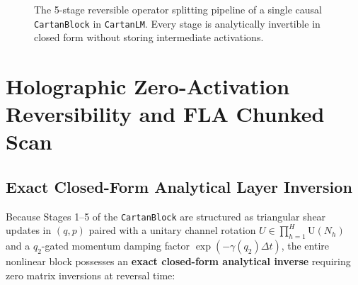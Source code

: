 \documentclass[11pt,a4paper]{article}
\begin{document}
\begin{figure}[!t]
\caption{The 5-stage reversible operator splitting pipeline of a single causal \texttt{CartanBlock} in \texttt{CartanLM}. Every stage is analytically invertible in closed form without storing intermediate activations.}
\label{fig:cartan_block_diagram}
\end{figure}

\section{Holographic Zero-Activation Reversibility and FLA Chunked Scan}
\label{sec:holographic_inversion}

\subsection{Exact Closed-Form Analytical Layer Inversion}
Because Stages 1--5 of the \texttt{CartanBlock} are structured as triangular shear updates in $(q, p)$ paired with a unitary channel rotation $U \in \prod_{h=1}^H \mathrm{U}(N_h)$ and a $q_2$-gated momentum damping factor $\exp(-\gamma(q_2)\Delta t)$, the entire nonlinear block possesses an \textbf{exact closed-form analytical inverse} requiring zero matrix inversions at reversal time:
\end{document}
